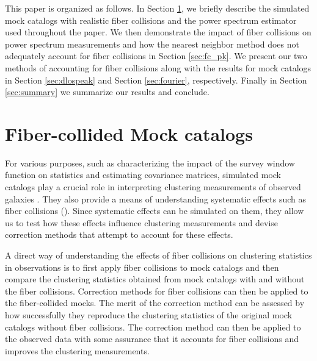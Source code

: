 This paper is organized as follows. 
In Section \ref{sec:catalog}, we briefly describe the simulated mock catalogs 
with realistic fiber collisions and the power spectrum estimator used throughout 
the paper. We then demonstrate the impact of fiber collisions on power spectrum 
measurements and how the nearest neighbor method does not adequately account 
for fiber collisions in Section \ref{sec:fc_pk}. We present our two methods 
of accounting for fiber collisions along with the results for mock catalogs in 
Section \ref{sec:dlospeak} and Section \ref{sec:fourier}, respectively. Finally 
in Section \ref{sec:summary} we summarize our results and conclude. 

\section{Fiber-collided Mock catalogs} \label{sec:catalog}
For various purposes, such as characterizing the impact of the survey window function on statistics and estimating covariance matrices, simulated mock 
catalogs play a crucial role in interpreting  
clustering measurements of observed galaxies 
\citep[][also see citations in \citealt{Chuang:2015aa}]{ Cole:1998aa, Scoccimarro:2002aa, Anderson:2012aa, Beutler:2014aa, Carretero:2015aa}. 
They also provide a means of understanding systematic effects such as  
fiber collisions (\citealt{Guo:2012aa, Manera:2013aa}).
Since systematic effects can be simulated on them, they allow us to test 
how these effects influence clustering measurements and devise correction 
methods that attempt to account for these effects.

A direct way of understanding the effects of fiber collisions on clustering 
statistics in observations is to first apply fiber collisions to mock catalogs
and then compare the clustering statistics obtained from mock catalogs with 
and without the fiber collisions. Correction methods for fiber collisions can 
then be applied to the fiber-collided mocks. The merit of the correction 
method can be assessed by how successfully they reproduce the clustering statistics 
of the original mock catalogs without fiber collisions. The correction 
method can then be applied to the observed data with some assurance that it 
accounts for fiber collisions and improves the clustering measurements. 

